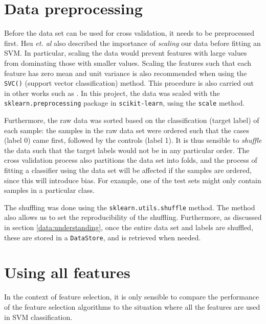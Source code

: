 \documentclass[12pt, twoside, a4paper]{report}
\begin{document}
\section{Data preprocessing}

Before the data set can be used for cross validation, it needs to be preprocessed first. Hsu \textit{et. al} also described the importance of \textit{scaling} our data before fitting an SVM. In particular, scaling the data would prevent features with large values from dominating those with smaller values. Scaling the features such that each feature has zero mean and unit variance is also recommended when using the \texttt{SVC()} (support vector classification) method. This procedure is also carried out in other works such as \cite{RefWorks:228}. In this project, the data was scaled with the \texttt{sklearn.preprocessing} package in \texttt{scikit-learn}, using the \texttt{scale} method.

Furthermore, the raw data was sorted based on the classification (target label) of each sample: the samples in the raw data set were ordered such that the cases (label 0) came first, followed by the controls (label 1). It is thus sensible to \textit{shuffle} the data such that the target labels would not be in any particular order. The cross validation process also partitions the data set into folds, and the process of fitting a classifier using the data set will be affected if the samples are ordered, since this will introduce bias. For example, one of the test sets might only contain samples in a particular class.

The shuffling was done using the \texttt{sklearn.utils.shuffle} method. The method also allows us to set the reproducibility of the shuffling. Furthermore, as discussed in section \ref{data:understanding}, once the entire data set and labels are shuffled, these are stored in a \texttt{DataStore}, and is retrieved when needed.



\section{Using all features} \label{data:all_features}

In the context of feature selection, it is only sensible to compare the performance of the feature selection algorithms to the situation where all the features are used in SVM classification.
\end{document}
